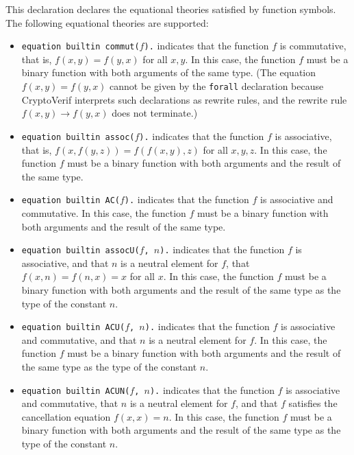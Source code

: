 \begin{itemize}
This declaration declares the equational theories satisfied by function symbols.
The following equational theories are supported:
\begin{itemize}

\item \texttt{equation builtin commut($f$).} indicates that the function $f$ is commutative,
that is, $f(x,y) = f(y,x)$ for all $x,y$. In this case, the function
$f$ must be a binary function with both arguments of the same type.
(The equation $f(x,y) = f(y,x)$ cannot be given by the {\tt forall}
declaration because CryptoVerif interprets such declarations as rewrite rules,
and the rewrite rule $f(x,y) \rightarrow f(y,x)$ does not terminate.)

\item \texttt{equation builtin assoc($f$).} indicates that the function $f$ is associative, that is, $f(x,f(y,z)) = f(f(x,y),z)$ for all $x,y,z$. In this case, the function $f$ must be a binary function with both arguments and the result of
the same type.

\item \texttt{equation builtin AC($f$).} indicates that the function $f$ is associative and commutative. In this case, the function $f$ must be a binary function with both arguments and the result of
the same type.

\item \texttt{equation builtin assocU($f$, $n$).} indicates that the function $f$ is associative, and that $n$ is a neutral element for $f$, that $f(x,n) = f(n,x) = x$ for all $x$. In this case, the function $f$ must be a binary function with both arguments and the result of the same type as the type of the constant $n$.

\item \texttt{equation builtin ACU($f$, $n$).} indicates that the function $f$ is associative and commutative, and that $n$ is a neutral element for $f$. In this case, the function $f$ must be a binary function with both arguments and the result of the same type as the type of the constant $n$.

\item \texttt{equation builtin ACUN($f$, $n$).} indicates that the function $f$ is associative and commutative, that $n$ is a neutral element for $f$, and that $f$ satisfies the cancellation equation $f(x,x) = n$. In this case, the function $f$ must be a binary function with both arguments and the result of the same type as the type of the constant $n$.


\end{itemize}
\end{itemize}
